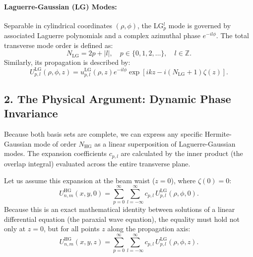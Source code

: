 \begin{resolucao}[Solution]
        \paragraph*{Laguerre-Gaussian (LG) Modes:}
        Separable in cylindrical coordinates $(\rho,\phi)$, the LG$_{p}^{l}$ mode is governed by associated Laguerre polynomials and a complex azimuthal phase $e^{-i l \phi}$. The total transverse mode order is defined as:
        \[
        N_{\text{LG}} = 2p + |l|, \quad p \in \{0, 1, 2, \dots\}, \quad l \in \mathbb{Z}.
        \]
        Similarly, its propagation is described by:
        \[
        U_{p,l}^{\text{LG}}(\rho,\phi,z) = u_{p,l}^{\text{LG}}(\rho,z) e^{-il\phi} \exp\left[ i k z - i(N_{\text{LG}} + 1)\zeta(z) \right].
        \]

    \subsection*{2. The Physical Argument: Dynamic Phase Invariance}

        Because both basis sets are complete, we can express any specific Hermite-Gaussian mode of order $N_{\text{HG}}$ as a linear superposition of Laguerre-Gaussian modes. The expansion coefficients $c_{p,l}$ are calculated by the inner product (the overlap integral) evaluated across the entire transverse plane. 
        
        Let us assume this expansion at the beam waist ($z=0$), where $\zeta(0) = 0$:
        \begin{equation}
            U_{n,m}^{\text{HG}}(x,y,0) = \sum_{p=0}^{\infty} \sum_{l=-\infty}^{\infty} c_{p,l} \, U_{p,l}^{\text{LG}}(\rho,\phi,0).
            \label{eq:expansion_z0}
        \end{equation}
        Because this is an exact mathematical identity between solutions of a linear differential equation (the paraxial wave equation), the equality must hold not only at $z=0$, but for all points $z$ along the propagation axis:
        \begin{equation}
            U_{n,m}^{\text{HG}}(x,y,z) = \sum_{p=0}^{\infty} \sum_{l=-\infty}^{\infty} c_{p,l} \, U_{p,l}^{\text{LG}}(\rho,\phi,z).
            \label{eq:expansion_z}
        \end{equation}
        

\end{resolucao}
